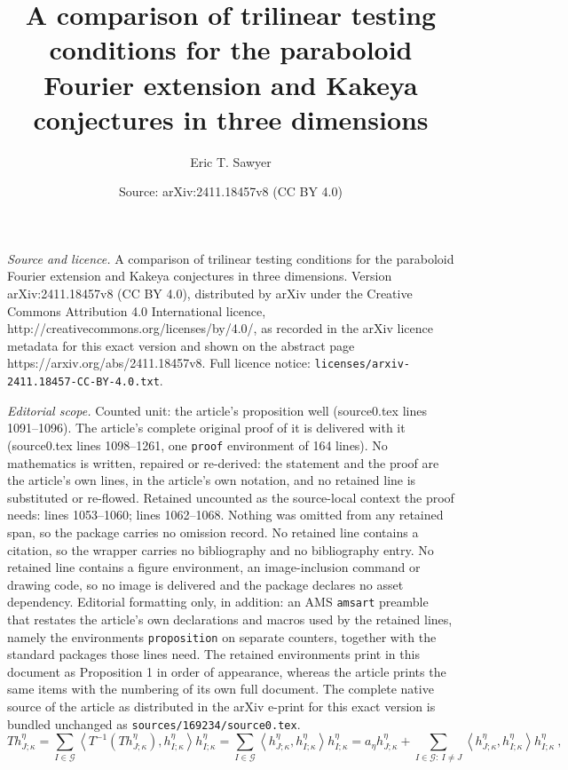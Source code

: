 \documentclass[10pt,a4paper]{amsart}
\title{A comparison of trilinear testing conditions for the paraboloid Fourier extension and Kakeya conjectures in three dimensions}
\author{Eric T. Sawyer}
\date{Source: arXiv:2411.18457v8 (CC BY 4.0)}
\begin{document}
\maketitle

\noindent\emph{Source and licence.} A comparison of trilinear testing conditions for the paraboloid Fourier extension and Kakeya conjectures in three dimensions. Version arXiv:2411.18457v8 (CC BY 4.0), distributed by arXiv under the Creative Commons Attribution 4.0 International licence, http://creativecommons.org/licenses/by/4.0/, as recorded in the arXiv licence metadata for this exact version and shown on the abstract page https://arxiv.org/abs/2411.18457v8. Full licence notice: \texttt{licenses/arxiv-2411.18457-CC-BY-4.0.txt}.\par\smallskip

\noindent\textit{Editorial scope.} Counted unit: the article's proposition well (source0.tex lines 1091--1096). The article's complete original proof of it is delivered with it (source0.tex lines 1098--1261, one \texttt{proof} environment of 164 lines). No mathematics is written, repaired or re-derived: the statement and the proof are the article's own lines, in the article's own notation, and no retained line is substituted or re-flowed.  Retained uncounted as the source-local context the proof needs: lines 1053--1060; lines 1062--1068.  Nothing was omitted from any retained span, so the package carries no omission record.  No retained line contains a citation, so the wrapper carries no bibliography and no bibliography entry.  No retained line contains a figure environment, an image-inclusion command or drawing code, so no image is delivered and the package declares no asset dependency.  Editorial formatting only, in addition: an AMS \texttt{amsart} preamble that restates the article's own declarations and macros used by the retained lines, namely the environments \texttt{proposition} on separate counters, together with the standard packages those lines need.  The retained environments print in this document as Proposition 1 in order of appearance, whereas the article prints the same items with the numbering of its own full document.  The complete native source of the article as distributed in the arXiv e-print for this exact version is bundled unchanged as \texttt{sources/169234/source0.tex}.
\begin{equation}
Th_{J;\kappa}^{\eta}=\sum_{I\in\mathcal{G}}\left\langle T^{-1}\left(
Th_{J;\kappa}^{\eta}\right)  ,h_{I;\kappa}^{\eta}\right\rangle h_{I;\kappa
}^{\eta}=\sum_{I\in\mathcal{G}}\left\langle h_{J;\kappa}^{\eta},h_{I;\kappa
}^{\eta}\right\rangle h_{I;\kappa}^{\eta}=a_{\eta}h_{J;\kappa}^{\eta}%
+\sum_{I\in\mathcal{G}:\ I\neq J}\left\langle h_{J;\kappa}^{\eta},h_{I;\kappa
}^{\eta}\right\rangle h_{I;\kappa}^{\eta}\ ,\label{ident}%
\end{equation}
\end{document}
